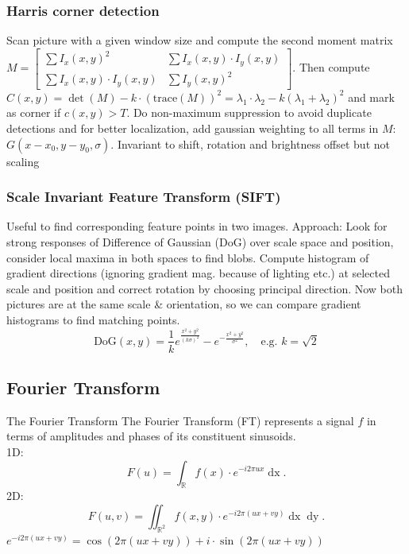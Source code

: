 \documentclass[a4paper,10pt]{article}
\begin{document}
\subsubsection{Harris corner detection} Scan picture with a given window size and compute the second moment matrix \( M = \left[\begin{smallmatrix}\sum I_x(x,y)^2 & \sum I_x(x,y)\cdot I_y(x,y) \\ \sum I_x(x,y)\cdot I_y(x,y) & \sum I_y(x,y)^2 \end{smallmatrix}\right] \). Then compute \( C(x,y) = \det(M) - k\cdot (\text{trace}(M))^2 = \lambda_1 \cdot \lambda_2 - k(\lambda_1 + \lambda_2)^2 \) and mark as corner if \( c(x,y) > T \). Do non-maximum suppression to avoid duplicate detections and for better localization, add gaussian weighting to all terms in \( M \): \( G(x-x_0, y-y_0, \sigma) \). Invariant to shift, rotation and brightness offset but not scaling
\subsubsection{Scale Invariant Feature Transform (SIFT)} Useful to find corresponding feature points in two images. Approach: Look for strong responses of Difference of Gaussian (DoG) over scale space and position, consider local maxima in both spaces to find blobs. Compute histogram of gradient directions (ignoring gradient mag. because of lighting etc.) at selected scale and position and correct rotation by choosing principal direction. Now both pictures are at the same scale \& orientation, so we can compare gradient histograms to find matching points. \[
	\text{DoG}(x,y) = \frac{1}{k} e^{\frac{x^2+y^2}{(k\sigma)^2}} - e^{-\frac{x^2+y^2}{\sigma ^2}}, \quad \text{e.g. } k=\sqrt{2} 
\] 

\subsection{Fourier Transform}

\begin{mainbox}{The Fourier Transform}	
    The Fourier Transform (FT) represents a signal \( f \) in terms of amplitudes and phases of its constituent sinusoids.\\
    1D: \[
	F(u) = \int_\mathbb{R} f(x) \cdot e^{-i2\pi ux} \mathop{dx}
    .\] 
    2D: \[
	F(u,v) = \iint_{\mathbb{R}^2} f(x,y) \cdot e^{-i2\pi(ux + vy)} \mathop{dx} \mathop{dy}
    .\] 
    \( e^{-i2\pi (ux+vy)} = \cos (2\pi (ux+vy)) + i \cdot \sin(2\pi (ux + vy)) \)
\end{mainbox}
\end{document}
